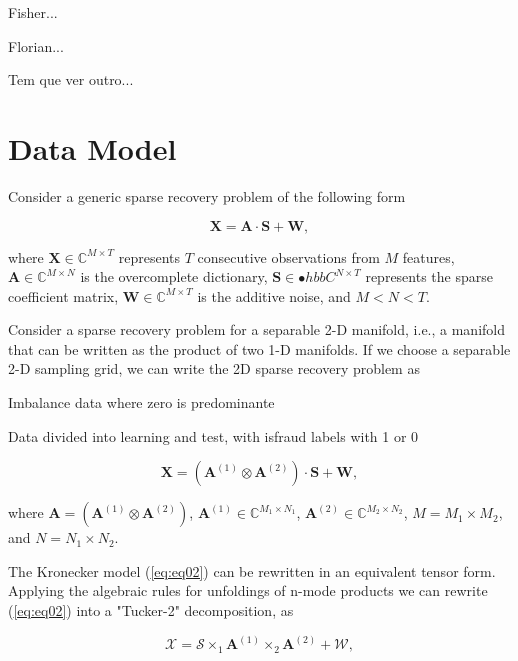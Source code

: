 Fisher...

Florian...

Tem que ver outro...

\section{Data Model}

Consider a generic sparse recovery problem of the following form

\begin{equation}\label{eq:eq01}
\boldsymbol{X} = \boldsymbol{A} \cdot \boldsymbol{S} + \boldsymbol{W},
\end{equation}

where $\boldsymbol{X} \in \mathbb{C}^{M \times T}$ represents $T$ consecutive observations from $M$ features, $\boldsymbol{A} \in \mathbb{C}^{M \times N}$ is the overcomplete dictionary, $\boldsymbol{S} \in \mathbb{•}hbb{C}^{N \times T}$ represents the sparse coefficient matrix, $\boldsymbol{W} \in \mathbb{C}^{M \times T}$ is the additive noise, and $M < N < T$.

Consider a sparse recovery problem for a separable 2-D manifold, i.e., a manifold that can be written as the product of two 1-D manifolds. If we choose a separable 2-D sampling grid, we can write the 2D sparse recovery problem as

Imbalance data where zero is predominante

Data divided into learning and test, with isfraud labels with 1 or 0

\begin{equation}\label{eq:eq02}
\boldsymbol{X} = (\boldsymbol{A}^{(1)} \otimes \boldsymbol{A}^{(2)}) \cdot \boldsymbol{S} + \boldsymbol{W},
\end{equation}

where $\boldsymbol{A} = (\boldsymbol{A}^{(1)} \otimes \boldsymbol{A}^{(2)})$, $\boldsymbol{A}^{(1)} \in \mathbb{C}^{M_1 \times N_1}$, $\boldsymbol{A}^{(2)} \in \mathbb{C}^{M_2 \times N_2}$, $M = M_1 \times M_2$, and $N = N_1 \times N_2$.

The Kronecker model (\ref{eq:eq02}) can be rewritten in an equivalent tensor form. Applying the algebraic rules for unfoldings of n-mode products \cite{roemer2014tensor} we can rewrite (\ref{eq:eq02}) into a "Tucker-2" decomposition, as

\begin{equation}\label{eq:eq03}
\boldsymbol{\mathcal{X}} = \boldsymbol{\mathcal{S}} \times_1 \boldsymbol{A}^{(1)} \times_2 \boldsymbol{A}^{(2)} +  \boldsymbol{\mathcal{W}},
\end{equation}

